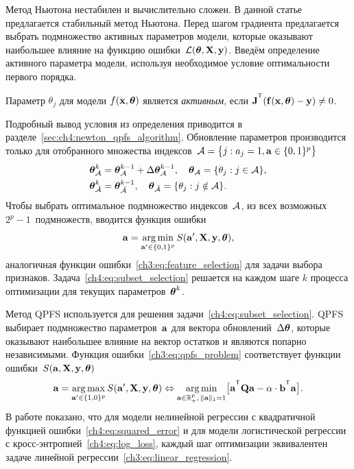 \documentclass[11pt, a5paper]{dissert}
\begin{document}
Метод Ньютона нестабилен и вычислительно сложен. 
В данной статье предлагается стабильный метод Ньютона. 
Перед шагом градиента предлагается выбрать подмножество активных параметров модели, которые оказывают наибольшее влияние на функцию ошибки~$\mathcal{L} (\boldsymbol{\theta}, \mathbf{X}, \mathbf{y})$.
Введём определение активного параметра модели, используя необходимое условие оптимальности первого порядка.
\begin{definition}
	\label{ch4:def:active_param}
	Параметр $\theta_j$ для модели $f(\mathbf{x}, \boldsymbol{\theta})$ является \textit{активным}, если $\bJ^{\T} (\mathbf{f}(\bx, \btheta) - \by) \neq 0$.
\end{definition}
Подробный вывод условия из определения приводится в разделе~\ref{sec:ch4:newton_qpfs_algorithm}.
Обновление параметров производится только для отобранного множества индексов~$\mathcal{A} = \bigl\{j: a_j = 1, \mathbf{a} \in \{0, 1\}^p\bigr\}$
\begin{align*}
	\boldsymbol{\theta}_{\mathcal{A}}^k &= \boldsymbol{\theta}_{\mathcal{A}}^{k - 1} + \Delta \boldsymbol{\theta}_{\mathcal{A}}^{k - 1}, \quad \boldsymbol{\theta}_{\mathcal{A}} = \{\theta_j: j \in \mathcal{A} \}, \\
	\boldsymbol{\theta}_{\bar{\mathcal{A}}}^k &= \boldsymbol{\theta}_{\bar{\mathcal{A}}}^{k - 1}, \quad \boldsymbol{\theta}_{\bar{\mathcal{A}}} = \{\theta_j: j \notin \mathcal{A} \}.
\end{align*}
Чтобы выбрать оптимальное подмножество индексов~$\mathcal{A}$, из всех возможных $2^p - 1$~подмножеств, вводится функция ошибки
\begin{equation}
	\mathbf{a} = \mathop{\arg \min}\limits_{\mathbf{a}' \in \{0, 1\}^p} S(\mathbf{a}', \mathbf{X}, \mathbf{y}, \boldsymbol{\theta}),
	\label{ch4:eq:subset_selection}
\end{equation}
аналогичная функции ошибки~\eqref{ch3:eq:feature_selection} для задачи выбора признаков. 
Задача~\eqref{ch4:eq:subset_selection} решается на каждом шаге $k$ процесса оптимизации для текущих параметров~$\boldsymbol{\theta}^k$.

Метод QPFS используется для решения задачи~\eqref{ch4:eq:subset_selection}.
QPFS выбирает подмножество параметров~$\mathbf{a}$ для вектора обновлений~$ \Delta \boldsymbol{\theta}$, которые оказывают наибольшее влияние на вектор остатков и являются попарно независимыми.
Функция ошибки~\eqref{ch3:eq:qpfs_problem} соответствует функции ошибки~$S(\mathbf{a}, \mathbf{X}, \mathbf{y}, \boldsymbol{\theta})$
\begin{equation}
	\ba = \argmax_{\ba' \in \{1, 0\}^p} S(\ba', \bX, \by, \btheta) \Leftrightarrow \argmin_{\ba  \in \bbR^p_+, \, \|\ba\|_1=1} \bigl[\ba^{\T} \bQ \ba - \alpha \cdot \mathbf{b}^{\T} \ba \bigr].
\end{equation}
В работе показано, что для модели нелинейной регрессии с квадратичной функцией ошибки~\eqref{ch4:eq:squared_error} и для модели логистической регрессии с кросс-энтропией~\eqref{ch4:eq:log_loss}, каждый шаг оптимизации эквивалентен задаче линейной регрессии~\eqref{ch3:eq:linear_regression}.
\end{document}
